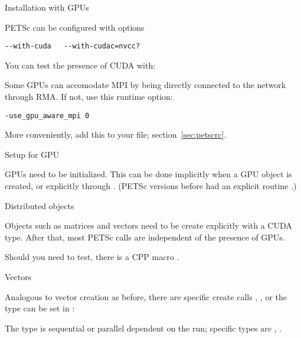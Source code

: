 
 {Installation with GPUs}

PETSc can be configured with options
\begin{verbatim}
--with-cuda   --with-cudac=nvcc?
\end{verbatim}
You can test the presence of CUDA with:


Some GPUs can accomodate MPI by being directly connected to the network
through  \ac{RMA}.
If not, use this runtime option:
\begin{verbatim}
-use_gpu_aware_mpi 0
\end{verbatim}
More conveniently, add this to your  file;
section~\ref{sec:petscrc}.

 {Setup for GPU}

GPUs need to be initialized.
This can be done implicitly when a GPU object is created,
or explicitly through .
(PETSc versions before 
had an explicit routine .)


 {Distributed objects}

Objects such as matrices and vectors need to be create
explicitly with a CUDA type.
After that, most PETSc calls are independent of the presence of GPUs.

Should you need to test, there is a \ac{CPP} macro
.

 {Vectors}

Analogous to vector creation as before,
there are specific create calls
,
,
or the type can be set in :


The type
is sequential or parallel dependent on the run;
specific types are 
,
.

